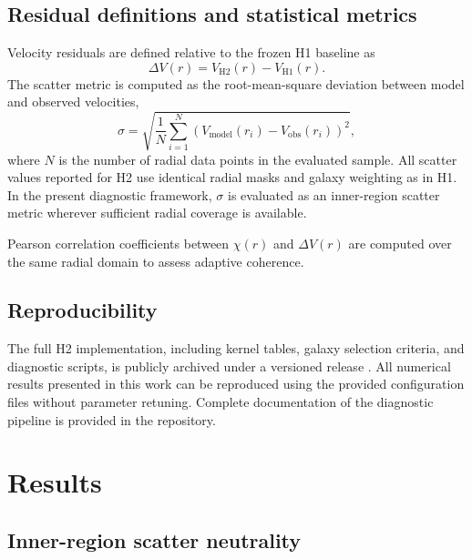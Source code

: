 \documentclass[twocolumn,linenumbers]{aastex701}
\begin{document}
\subsection{Residual definitions and statistical metrics}

Velocity residuals are defined relative to the frozen H1 baseline as
\begin{equation}
	\Delta V(r) = V_{\mathrm{H2}}(r) - V_{\mathrm{H1}}(r).
	\label{eq:deltav}
\end{equation}
The scatter metric is computed as the root-mean-square deviation between
model and observed velocities,
\begin{equation}
	\sigma = \sqrt{\frac{1}{N}\sum_{i=1}^{N}
		\left(V_{\mathrm{model}}(r_i) - V_{\mathrm{obs}}(r_i)\right)^2},
	\label{eq:rms}
\end{equation}
where $N$ is the number of radial data points in the evaluated sample.
All scatter values reported for H2 use identical radial masks and galaxy
weighting as in H1. In the present diagnostic framework, $\sigma$ is
evaluated as an inner-region scatter metric wherever sufficient radial
coverage is available.

Pearson correlation coefficients between $\chi(r)$ and $\Delta V(r)$
are computed over the same radial domain to assess adaptive coherence.

\subsection{Reproducibility}

The full H2 implementation, including kernel tables, galaxy selection
criteria, and diagnostic scripts, is publicly archived under a versioned
release \citep{h2model2026}. All numerical results presented in this work
can be reproduced using the provided configuration files without parameter
retuning. Complete documentation of the diagnostic pipeline is provided
in the repository.

\section{Results}
\label{sec:results}

\subsection{Inner-region scatter neutrality}
\end{document}
